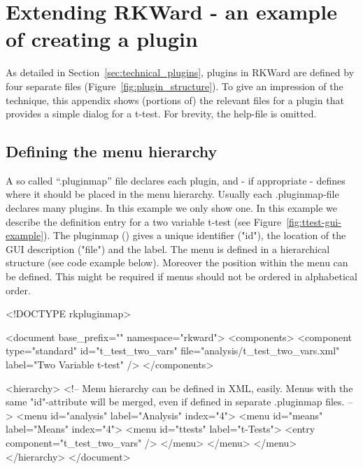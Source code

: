 \section{Extending RKWard - an example of creating a plugin}
\label{sec:example_plugin}
As detailed in Section~\ref{sec:technical_plugins}, plugins in RKWard are
defined by four separate files (Figure~\ref{fig:plugin_structure}). To give an impression of the technique,
this appendix shows (portions of) the relevant files for a plugin that provides
a simple dialog for a t-test. For brevity, the help-file is omitted.

\subsection{Defining the menu hierarchy}
\label{sec:defining_menu_hierarchy}
A so called ``.pluginmap'' file declares each plugin, and - if appropriate - defines where it should
be placed in the menu hierarchy. Usually each .pluginmap-file declares many plugins. In this example
we only show one.
In this example we describe the definition entry for a two variable t-test (see Figure~\ref{fig:ttest-gui-example}). 
The pluginmap () gives a unique identifier ("id"), the location of the GUI description ("file") and the label. The menu
is defined in a hierarchical structure (see code example below). Moreover the position within the menu can be defined.
This might be required if menus should not be ordered in alphabetical order.

\begin{Code}
<!DOCTYPE rkpluginmap>

<document base_prefix="" namespace="rkward">
  <components>
    <component type="standard" id="t_test_two_vars" file="analysis/t_test_two_vars.xml" label="Two Variable t-test" />
  </components>

  <hierarchy>
    <!-- Menu hierarchy can be defined in XML, easily.
    Menus with the same "id"-attribute will be merged, even if defined in
    separate .pluginmap files. -->
    <menu id="analysis" label="Analysis" index="4">
      <menu id="means" label="Means" index="4">
        <menu id="ttests" label="t-Tests">
          <entry component="t_test_two_vars" />
        </menu>
      </menu>
    </menu>
  </hierarchy>
</document>
\end{Code}

